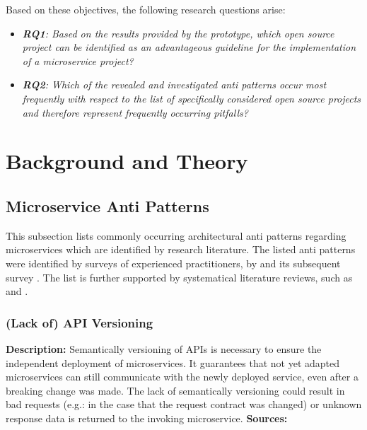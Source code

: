 \documentclass{article}
\begin{document}
\noindent Based on these objectives, the following research questions arise:
\begin{itemize}
    \item \textit{\textbf{RQ1}: Based on the results provided by the prototype, which open source project can be identified as an advantageous guideline for the implementation of a microservice project?}
    \item \textit{\textbf{RQ2}: Which of the revealed and investigated anti patterns occur most frequently with respect to the list of specifically considered open source projects and therefore represent frequently occurring pitfalls?}
\end{itemize}

\section{Background and Theory}
\subsection{Microservice Anti Patterns}
This subsection lists commonly occurring architectural anti patterns regarding microservices which are identified by research literature.
The listed anti patterns were identified by surveys of experienced practitioners, by \cite{taibi_definition_2018} and its subsequent survey \cite{taibi_microservices_2020}. The list is further supported by systematical literature reviews, such as \cite{neri_design_2019} and \cite{bogner_towards_2019}.

\subsubsection{(Lack of) API Versioning}
\noindent\textbf{Description:} Semantically versioning of APIs is necessary to ensure the independent deployment of microservices. It guarantees that not yet adapted microservices can still communicate with the newly deployed service, even after a breaking change was made. The lack of semantically versioning could result in bad requests (e.g.: in the case that the request contract was changed) or unknown response data is returned to the invoking microservice.\newline
\noindent\textbf{Sources:} \cite{
    taibi_definition_2018,
    taibi_microservices_2020,
    bogner_towards_2019,
    zimmermann_interface_2017,
    zimmermann_microservices_2017}
\end{document}

